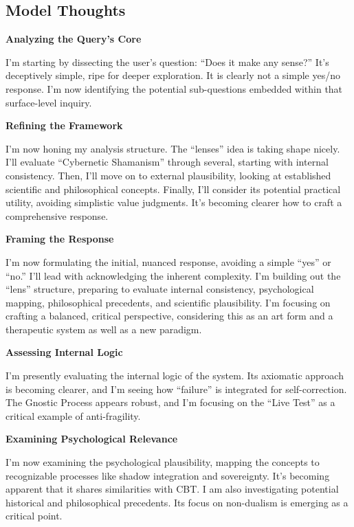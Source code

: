 \documentclass{article}
\begin{document}
\subsection*{Model Thoughts}\label{model-thoughts}

\textbf{Analyzing the Query's Core}

I'm starting by dissecting the user's question: ``Does it make any
sense?'' It's deceptively simple, ripe for deeper exploration. It is
clearly not a simple yes/no response. I'm now identifying the potential
sub-questions embedded within that surface-level inquiry.

\textbf{Refining the Framework}

I'm now honing my analysis structure. The ``lenses'' idea is taking
shape nicely. I'll evaluate ``Cybernetic Shamanism'' through several,
starting with internal consistency. Then, I'll move on to external
plausibility, looking at established scientific and philosophical
concepts. Finally, I'll consider its potential practical utility,
avoiding simplistic value judgments. It's becoming clearer how to craft
a comprehensive response.

\textbf{Framing the Response}

I'm now formulating the initial, nuanced response, avoiding a simple
``yes'' or ``no.'' I'll lead with acknowledging the inherent complexity.
I'm building out the ``lens'' structure, preparing to evaluate internal
consistency, psychological mapping, philosophical precedents, and
scientific plausibility. I'm focusing on crafting a balanced, critical
perspective, considering this as an art form and a therapeutic system as
well as a new paradigm.

\textbf{Assessing Internal Logic}

I'm presently evaluating the internal logic of the system. Its axiomatic
approach is becoming clearer, and I'm seeing how ``failure'' is
integrated for self-correction. The Gnostic Process appears robust, and
I'm focusing on the ``Live Test'' as a critical example of
anti-fragility.

\textbf{Examining Psychological Relevance}

I'm now examining the psychological plausibility, mapping the concepts
to recognizable processes like shadow integration and sovereignty. It's
becoming apparent that it shares similarities with CBT. I am also
investigating potential historical and philosophical precedents. Its
focus on non-dualism is emerging as a critical point.
\end{document}
